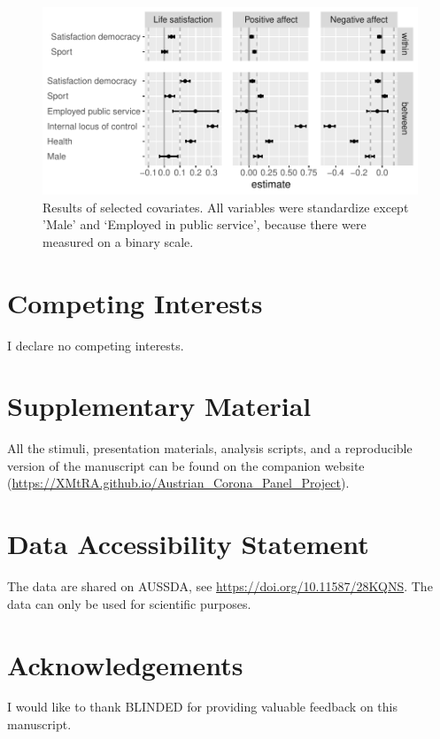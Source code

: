 \documentclass[
  man,mask]{apa6}
\begin{document}
\newpage

\begin{figure}
\includegraphics[width=\textwidth]{manuscript_files/figure-latex/res-control-1} \caption{Results of selected covariates. All variables were standardize except 'Male'  and ‘Employed in public service', because there were measured on a binary scale.}\label{fig:res-control}
\end{figure}

\newpage

\hypertarget{competing-interests}{%
\section{Competing Interests}\label{competing-interests}}

I declare no competing interests.

\hypertarget{supplementary-material}{%
\section{Supplementary Material}\label{supplementary-material}}

All the stimuli, presentation materials, analysis scripts, and a reproducible version of the manuscript can be found on the companion website (\url{https://XMtRA.github.io/Austrian_Corona_Panel_Project}).

\hypertarget{data-accessibility-statement}{%
\section{Data Accessibility Statement}\label{data-accessibility-statement}}

The data are shared on AUSSDA, see \url{https://doi.org/10.11587/28KQNS}.
The data can only be used for scientific purposes.

\hypertarget{acknowledgements}{%
\section{Acknowledgements}\label{acknowledgements}}

I would like to thank BLINDED for providing valuable feedback on this manuscript.
\end{document}
